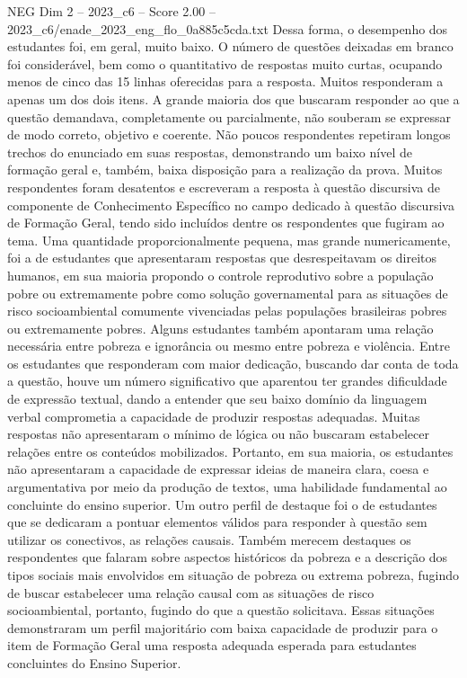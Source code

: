 \begin{textsample}{NEG Dim 2 – 2023\_c6 – Score 2.00 – 2023\_c6/enade\_2023\_eng\_flo\_0a885c5cda.txt}
Dessa forma, o desempenho dos estudantes foi, em geral, muito baixo.
O número de questões deixadas em branco foi considerável, bem como o quantitativo de respostas muito curtas, ocupando menos de cinco das 15 linhas oferecidas para a resposta.
Muitos responderam a apenas um dos dois itens.
A grande maioria dos que buscaram responder ao que a questão demandava, completamente ou parcialmente, não souberam se expressar de modo correto, objetivo e coerente.
Não poucos respondentes repetiram longos trechos do enunciado em suas respostas, demonstrando um baixo nível de formação geral e, também, baixa disposição para a realização da prova.
Muitos respondentes foram desatentos e escreveram a resposta à questão discursiva de componente de Conhecimento Específico no campo dedicado à questão discursiva de Formação Geral, tendo sido incluídos dentre os respondentes que fugiram ao tema.
Uma quantidade proporcionalmente pequena, mas grande numericamente, foi a de estudantes que apresentaram respostas que desrespeitavam os direitos humanos, em sua maioria propondo o controle reprodutivo sobre a população pobre ou extremamente pobre como solução governamental para as situações de risco socioambiental comumente vivenciadas pelas populações brasileiras pobres ou extremamente pobres.
Alguns estudantes também apontaram uma relação necessária entre pobreza e ignorância ou mesmo entre pobreza e violência.
Entre os estudantes que responderam com maior dedicação, buscando dar conta de toda a questão, houve um número significativo que aparentou ter grandes dificuldade de expressão textual, dando a entender que seu baixo domínio da linguagem verbal comprometia a capacidade de produzir respostas adequadas.
Muitas respostas não apresentaram o mínimo de lógica ou não buscaram estabelecer relações entre os conteúdos mobilizados.
Portanto, em sua maioria, os estudantes não apresentaram a capacidade de expressar ideias de maneira clara, coesa e argumentativa por meio da produção de textos, uma habilidade fundamental ao concluinte do ensino superior.
Um outro perfil de destaque foi o de estudantes que se dedicaram a pontuar elementos válidos para responder à questão sem utilizar os conectivos, as relações causais.
Também merecem destaques os respondentes que falaram sobre aspectos históricos da pobreza e a descrição dos tipos sociais mais envolvidos em situação de pobreza ou extrema pobreza, fugindo de buscar estabelecer uma relação causal com as situações de risco socioambiental, portanto, fugindo do que a questão solicitava.
Essas situações demonstraram um perfil majoritário com baixa capacidade de produzir para o item de Formação Geral uma resposta adequada esperada para estudantes concluintes do Ensino Superior.

\end{textsample}

